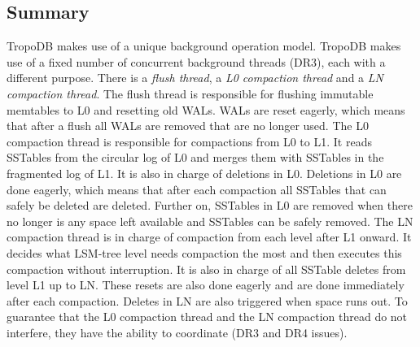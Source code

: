 \subsection{Summary}
TropoDB makes use of a unique background operation model. TropoDB makes use of a fixed number of concurrent background threads (DR3), each with a different purpose. There is a \textit{flush thread}, a \textit{L0 compaction thread} and a \textit{LN compaction thread}. The flush thread is responsible for flushing immutable memtables to L0 and resetting old WALs. WALs are reset eagerly, which means that after a flush all WALs are removed that are no longer used. The L0 compaction thread is responsible for compactions from L0 to L1. It reads SSTables from the circular log of L0 and merges them with SSTables in the fragmented log of L1. It is also in charge of deletions in L0. Deletions in L0 are done eagerly, which means that after each compaction all SSTables that can safely be deleted are deleted. Further on, SSTables in L0 are removed when there no longer is any space left available and SSTables can be safely removed. The LN compaction thread is in charge of compaction from each level after L1 onward. It decides what LSM-tree level needs compaction the most and then executes this compaction without interruption. It is also in charge of all SSTable deletes from level L1 up to LN. These resets are also done eagerly and are done immediately after each compaction. Deletes in LN are also triggered when space runs out.  To guarantee that the L0 compaction thread and the LN compaction thread do not interfere, they have the ability to coordinate (DR3 and DR4 issues). 

